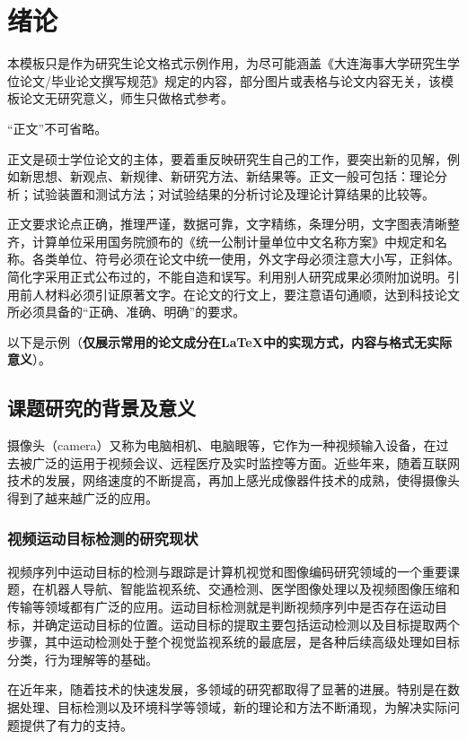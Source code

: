
\section{绪论}

本模板只是作为研究生论文格式示例作用，为尽可能涵盖《大连海事大学研究生学位论文/毕业论文撰写规范》规定的内容，部分图片或表格与论文内容无关，该模板论文无研究意义，师生只做格式参考。

“正文”不可省略。

正文是硕士学位论文的主体，要着重反映研究生自己的工作，要突出新的见解，例如新思想、新观点、新规律、新研究方法、新结果等。正文一般可包括：理论分析；试验装置和测试方法；对试验结果的分析讨论及理论计算结果的比较等。

正文要求论点正确，推理严谨，数据可靠，文字精练，条理分明，文字图表清晰整齐，计算单位采用国务院颁布的《统一公制计量单位中文名称方案》中规定和名称。各类单位、符号必须在论文中统一使用，外文字母必须注意大小写，正斜体。简化字采用正式公布过的，不能自造和误写。利用别人研究成果必须附加说明。引用前人材料必须引证原著文字。在论文的行文上，要注意语句通顺，达到科技论文所必须具备的“正确、准确、明确”的要求。

以下是示例（{\bf 仅展示常用的论文成分在LaTeX中的实现方式，内容与格式无实际意义}）。

\subsection{课题研究的背景及意义}

摄像头（camera）又称为电脑相机、电脑眼等，它作为一种视频输入设备，在过去被广泛的运用于视频会议、远程医疗及实时监控等方面。近些年来，随着互联网技术的发展，网络速度的不断提高，再加上感光成像器件技术的成熟，使得摄像头得到了越来越广泛的应用。

\subsubsection{视频运动目标检测的研究现状}

视频序列中运动目标的检测与跟踪是计算机视觉和图像编码研究领域的一个重要课题，在机器人导航、智能监视系统、交通检测、医学图像处理以及视频图像压缩和传输等领域都有广泛的应用。运动目标检测就是判断视频序列中是否存在运动目标，并确定运动目标的位置。运动目标的提取主要包括运动检测以及目标提取两个步骤，其中运动检测处于整个视觉监视系统的最底层，是各种后续高级处理如目标分类，行为理解等的基础。

在近年来，随着技术的快速发展，多领域的研究都取得了显著的进展。特别是在数据处理、目标检测以及环境科学等领域，新的理论和方法不断涌现，为解决实际问题提供了有力的支持。

